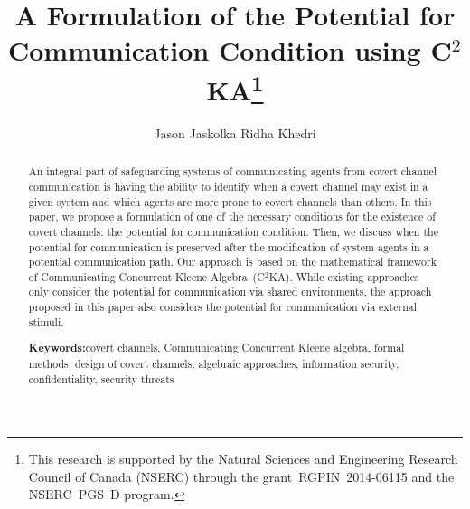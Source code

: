 \documentclass[copyright,creativecommons]{eptcs}
\makeatletter
\newcommand{\PFC}{potential for communication\@\xspace}
\newcommand{\socas}{systems of communicating agents\@\xspace}
\newcommand{\CCKA}{Communicating Concurrent Kleene Algebra\@\xspace}
\newcommand{\CCKAabbrv}{C$^2$KA\@\xspace}
\newcommand{\keywords}[1]{\par\addvspace\baselineskip\noindent
							\textbf{Keywords:}\enspace\ignorespaces#1}
\makeatother
\begin{document}
\title{A Formulation of the Potential for \\ Communication Condition using \CCKAabbrv\footnote{This research is supported by the Natural Sciences and Engineering Research Council of Canada (NSERC) through the grant~RGPIN~2014-06115 and the NSERC~PGS~D program.}}
\author{Jason Jaskolka \qquad\qquad Ridha Khedri
}
\def\titlerunning{A Formulation of the Potential for Communication Condition using \emph{\CCKAabbrv}}
\def\authorrunning{J. Jaskolka and R. Khedri}
		
\maketitle


\begin{abstract}
\vspace{-0.1in}
	An integral part of safeguarding \socas from covert channel communication is having the ability to identify when a covert channel may exist in a given system and which agents are more prone to covert channels than others. In this paper, we propose a formulation of one of the necessary conditions for the existence of covert channels: the \PFC condition. Then, we discuss when the \PFC is preserved after the modification of system agents in a potential communication path. Our approach is based on the mathematical framework of \CCKA~(\CCKAabbrv). While existing approaches only consider the potential for communication via shared environments, the approach proposed in this paper also considers the potential for communication via external stimuli.  	
	\keywords{covert channels, Communicating Concurrent Kleene algebra, formal methods, design of covert channels, algebraic approaches, information security, confidentiality, security threats}
\end{abstract}

\vspace{-0.1in}	
\end{document}
